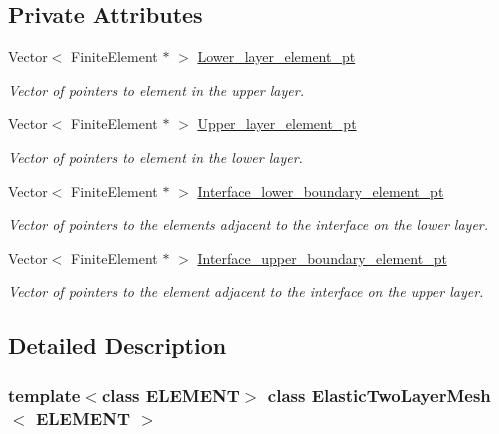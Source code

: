 \subsection*{Private Attributes}
\begin{DoxyCompactItemize}
\item 
Vector$<$ Finite\+Element $\ast$ $>$ \hyperlink{classElasticTwoLayerMesh_a4f8c33eaaa185e8c8710883ee9b5811f}{Lower\+\_\+layer\+\_\+element\+\_\+pt}
\begin{DoxyCompactList}\small\item\em Vector of pointers to element in the upper layer. \end{DoxyCompactList}\item 
Vector$<$ Finite\+Element $\ast$ $>$ \hyperlink{classElasticTwoLayerMesh_ae46d4ef2bb95a6c023bd0dc1e367ccfb}{Upper\+\_\+layer\+\_\+element\+\_\+pt}
\begin{DoxyCompactList}\small\item\em Vector of pointers to element in the lower layer. \end{DoxyCompactList}\item 
Vector$<$ Finite\+Element $\ast$ $>$ \hyperlink{classElasticTwoLayerMesh_abc8751d632399afe56df6c32e1001582}{Interface\+\_\+lower\+\_\+boundary\+\_\+element\+\_\+pt}
\begin{DoxyCompactList}\small\item\em Vector of pointers to the elements adjacent to the interface on the lower layer. \end{DoxyCompactList}\item 
Vector$<$ Finite\+Element $\ast$ $>$ \hyperlink{classElasticTwoLayerMesh_af8218bd023535d3dbf4af3cf7bc1c12d}{Interface\+\_\+upper\+\_\+boundary\+\_\+element\+\_\+pt}
\begin{DoxyCompactList}\small\item\em Vector of pointers to the element adjacent to the interface on the upper layer. \end{DoxyCompactList}\end{DoxyCompactItemize}


\subsection{Detailed Description}
\subsubsection*{template$<$class E\+L\+E\+M\+E\+NT$>$\newline
class Elastic\+Two\+Layer\+Mesh$<$ E\+L\+E\+M\+E\+N\+T $>$}

